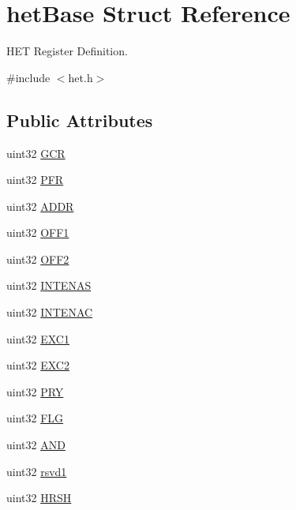 \hypertarget{structhetBase}{}\section{het\+Base Struct Reference}
\label{structhetBase}


H\+ET Register Definition.  




{\ttfamily \#include $<$het.\+h$>$}

\subsection*{Public Attributes}
\begin{DoxyCompactItemize}
\item 
uint32 \mbox{\hyperlink{structhetBase_a9e649c2a8b62a3d6341e6bc7003e128f}{G\+CR}}
\item 
uint32 \mbox{\hyperlink{structhetBase_a5577d008bd9cde655f33e5f1b24e7c82}{P\+FR}}
\item 
uint32 \mbox{\hyperlink{structhetBase_a2a49654a88587688ed901d5233a04836}{A\+D\+DR}}
\item 
uint32 \mbox{\hyperlink{structhetBase_a11659ceeb8b0e0c00267a9a8c726e8a3}{O\+F\+F1}}
\item 
uint32 \mbox{\hyperlink{structhetBase_ab01cc545d16ca7092c45ba8380142adc}{O\+F\+F2}}
\item 
uint32 \mbox{\hyperlink{structhetBase_a961d18a15bf297dcda8acd084db60b23}{I\+N\+T\+E\+N\+AS}}
\item 
uint32 \mbox{\hyperlink{structhetBase_a23666554c020885862683adb849a96cf}{I\+N\+T\+E\+N\+AC}}
\item 
uint32 \mbox{\hyperlink{structhetBase_ae10fa53c3fffe6c6c1603c7de120a538}{E\+X\+C1}}
\item 
uint32 \mbox{\hyperlink{structhetBase_a6d39e0c9792e065662f0b0d7e3f3a182}{E\+X\+C2}}
\item 
uint32 \mbox{\hyperlink{structhetBase_adb41df05bfb1d2a610f3ad458a59c0cf}{P\+RY}}
\item 
uint32 \mbox{\hyperlink{structhetBase_ad2e3864f704c917203f762fc5c44dbcc}{F\+LG}}
\item 
uint32 \mbox{\hyperlink{structhetBase_af69f69e894780b741409bc2fff886675}{A\+ND}}
\item 
uint32 \mbox{\hyperlink{structhetBase_aa476ef119c0d3b46c8f42b9069486aa0}{rsvd1}}
\item 
uint32 \mbox{\hyperlink{structhetBase_a838a22e5b9f2575ccb1360029afdaa43}{H\+R\+SH}}

\end{DoxyCompactItemize}
